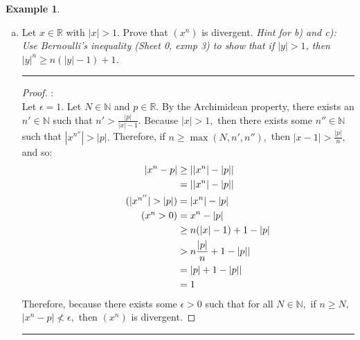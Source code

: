 \documentclass[openany, amssymb, psamsfonts]{amsart}
\newcommand{\bbN}{\mathbb{N}}
\newcommand{\bbR}{\mathbb{R}}
\newcommand{\abs}[1]{\lvert #1 \rvert}
\theoremstyle{definition}
\newtheorem{exmp}{Example}[section]
\numberwithin{equation}{section}
\begin{document}
\begin{exmp}
\begin{enumerate}[(a)]
\begin{proof}
  \end{proof}   \vspace{4pt}     \hrule   \vspace{4pt}
		\item Let $x\in\bbR$ with $\abs{x}>1$. Prove that $(x^n)$ is divergent.
		{\it Hint for b) and c): Use Bernoulli's inequality (Sheet 0, exmp 3) to show that if $|y|>1$, then $|y|^n\geq n(|y|-1)+1$. }
\vspace{4pt}     \hrule   \vspace{4pt} \begin{proof}:\\
Let $\epsilon = 1.$ Let $N\in \bbN$ and $p\in \bbR.$ By the Archimidean property, there exists an $n' \in \bbN$ such that $n'>\frac{|p|}{|x|-1}.$ Because $|x|>1,$ then there exists some $n'' \in \bbN$ such that $|x^{n''}|>|p|.$ Therefore, if $n \geq \max(N,n', n''),$ then $|x-1|> \frac{|p|}{n},$ and so:
\begin{align*}
|x^n - p|&\geq ||x^n| - |p||\\
&= ||x^n| - |p||\\
\tag{$|x^{n''}|>|p|$}&= |x^n| - |p|\\
\tag{$x^n>0$}&= x^n - |p|\\
&\geq n(|x|-1) +1 - |p|\\
&> n\frac{|p|}{n} +1 - |p||\\
&= |p| +1 - |p||\\
&= 1
\end{align*}
Therefore, because there exists some $\epsilon >0$ such that for all $N \in \bbN,$ if $n\geq N,$ $|x^n - p|\not < \epsilon,$ then $(x^n)$ is divergent.
\end{proof}\vspace{4pt}     \hrule   \vspace{4pt} 
	\end{enumerate}
\end{exmp}
\end{document}
